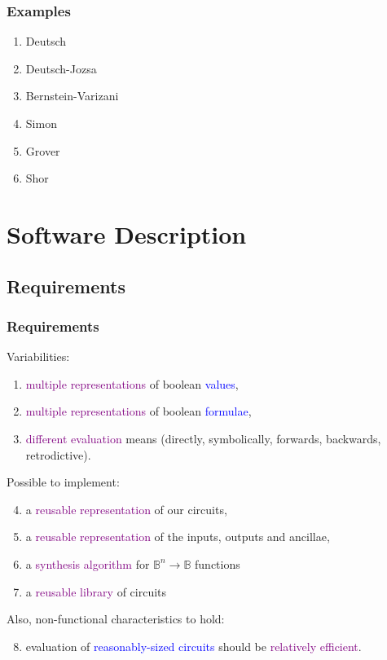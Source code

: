\documentclass{beamer}
\newcommand{\Bool}{\ensuremath{\mathbb{B}}}
\newcommand{\pub}[1]{\textcolor{purple}{#1}}
\newcommand{\blu}[1]{\textcolor{blue}{#1}}
\begin{document}
\begin{frame}

\frametitle{Examples}

\begin{enumerate}
  \item Deutsch
  \item Deutsch-Jozsa
  \item Bernstein-Varizani
  \item Simon
  \item Grover
  \item Shor
\end{enumerate}

\end{frame}


\section[Software]{Software Description}
\subsection[Requirements]{Requirements}
\begin{frame}
  \frametitle{Requirements}
  Variabilities:
\begin{enumerate}
  \item \pub{multiple representations} of boolean \blu{values},
  \item \pub{multiple representations} of boolean \blu{formulae}, 
  \item \pub{different evaluation} means (directly, symbolically, forwards,
    backwards, retrodictive).
\end{enumerate}

\noindent Possible to implement:
\begin{enumerate}
    \setcounter{enumi}{3}
  \item a \pub{reusable representation} of our circuits,
  \item a \pub{reusable representation} of the inputs, outputs and ancillae,
  \item a \pub{synthesis algorithm} for $\Bool^n\rightarrow\Bool$ functions
  \item a \pub{reusable library} of circuits
\end{enumerate}

Also, non-functional characteristics to hold:
\begin{enumerate}
    \setcounter{enumi}{7}
  \item evaluation of \blu{reasonably-sized circuits} should be 
    \pub{relatively efficient}.
\end{enumerate}

\end{frame}
\end{document}
